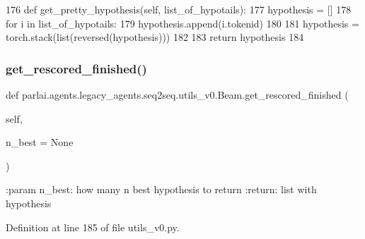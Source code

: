\begin{DoxyCode}
176     \textcolor{keyword}{def }get\_pretty\_hypothesis(self, list\_of\_hypotails):
177         hypothesis = []
178         \textcolor{keywordflow}{for} i \textcolor{keywordflow}{in} list\_of\_hypotails:
179             hypothesis.append(i.tokenid)
180 
181         hypothesis = torch.stack(list(reversed(hypothesis)))
182 
183         \textcolor{keywordflow}{return} hypothesis
184 
\end{DoxyCode}
\mbox{\label{classparlai_1_1agents_1_1legacy__agents_1_1seq2seq_1_1utils__v0_1_1Beam_a3c573eb1104002cb7da1483a6afb3cfe}} 
\subsubsection{\texorpdfstring{get\+\_\+rescored\+\_\+finished()}{get\_rescored\_finished()}}
{\footnotesize\ttfamily def parlai.\+agents.\+legacy\+\_\+agents.\+seq2seq.\+utils\+\_\+v0.\+Beam.\+get\+\_\+rescored\+\_\+finished (\begin{DoxyParamCaption}\item[{}]{self,  }\item[{}]{n\+\_\+best = {\ttfamily None} }\end{DoxyParamCaption})}

\begin{DoxyVerb}:param n_best: how many n best hypothesis to return
:return: list with hypothesis
\end{DoxyVerb}
 

Definition at line 185 of file utils\+\_\+v0.\+py.


